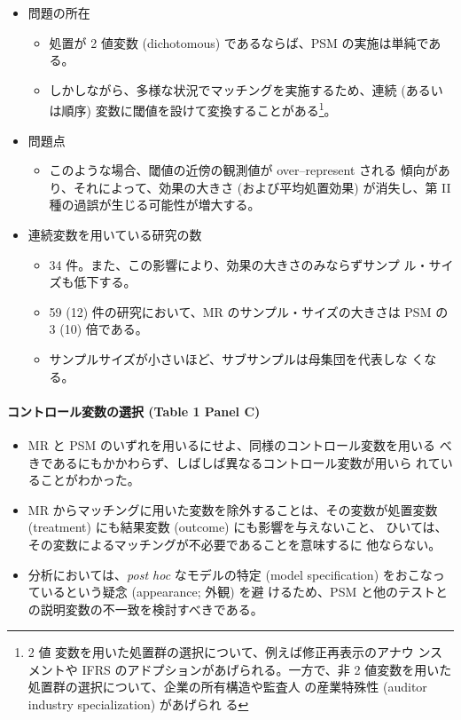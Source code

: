 \begin{itemize}
 \item 問題の所在
       \begin{itemize}
        \item 処置が 2 値変数 (dichotomous) であるならば、PSM の実施は単純である。
        \item しかしながら、多様な状況でマッチングを実施するため、連続 (あるい
              は順序) 変数に閾値を設けて変換することがある\footnote{2 値
              変数を用いた処置群の選択について、例えば修正再表示のアナウ
              ンスメントや IFRS のアドプションがあげられる。一方で、非 2
              値変数を用いた処置群の選択について、企業の所有構造や監査人
              の産業特殊性 (auditor industry specialization) があげられ
              る}。
       \end{itemize}
 \item 問題点
       \begin{itemize}
        \item このような場合、閾値の近傍の観測値が over--represent される
              傾向があり、それによって、効果の大きさ (および平均処置効果)
              が消失し、第 II 種の過誤が生じる可能性が増大する。
       \end{itemize}
 \item 連続変数を用いている研究の数
       \begin{itemize}
        \item 34 件。また、この影響により、効果の大きさのみならずサンプ
              ル・サイズも低下する。
        \item 59 (12) 件の研究において、MR のサンプル・サイズの大きさは
              PSM の 3 (10) 倍である。
        \item サンプルサイズが小さいほど、サブサンプルは母集団を代表しな
              くなる。
       \end{itemize}
\end{itemize}

\paragraph{コントロール変数の選択 (Table 1 Panel C)}

\begin{itemize}
 \item MR と PSM のいずれを用いるにせよ、同様のコントロール変数を用いる
       べきであるにもかかわらず、しばしば異なるコントロール変数が用いら
       れていることがわかった。
 \item MR からマッチングに用いた変数を除外することは、その変数が処置変数
       (treatment) にも結果変数 (outcome) にも影響を与えないこと、
       ひいては、その変数によるマッチングが不必要であることを意味するに
       他ならない。
 \item 分析においては、\textit{post hoc} なモデルの特定 (model
       specification) をおこなっているという疑念 (appearance; 外観) を避
       けるため、PSM と他のテストとの説明変数の不一致を検討すべきである。
\end{itemize}

